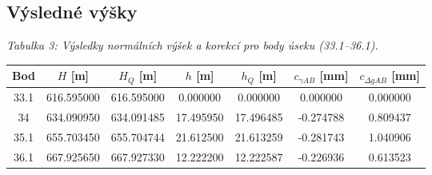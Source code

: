 \hspace{1 cm}

\subsection{Výsledné výšky}

\begin{table}[H]
  \centering
  \textit{Tabulka 3: Výsledky normálních výšek a korekcí pro body úseku (33.1–36.1).}
  \begin{tabular}{|c|c|c|c|c|c|c|}
    \hline
    \textbf{Bod} & \textbf{\(H\) [m]} & \textbf{\(H_Q\) [m]} & \textbf{\(h\) [m]} & \textbf{\(h_Q\) [m]} & \textbf{\(c_{\gamma AB}\) [mm]} & \textbf{\(c_{\Delta g AB}\) [mm]} \\
    \hline\hline
    33.1 & 616.595000 & 616.595000 & 0.000000 & 0.000000 &  0.000000 & 0.000000 \\
    34 & 634.090950 & 634.091485 & 17.495950 & 17.496485 & -0.274788 & 0.809437 \\
    35.1 & 655.703450 & 655.704744 & 21.612500 & 21.613259 & -0.281743 & 1.040906 \\
    36.1 & 667.925650 & 667.927330 & 12.222200 & 12.222587 & -0.226936 & 0.613523 \\
    \hline
  \end{tabular}
  \label{tab:norm_vysky_33_36}
\end{table}
